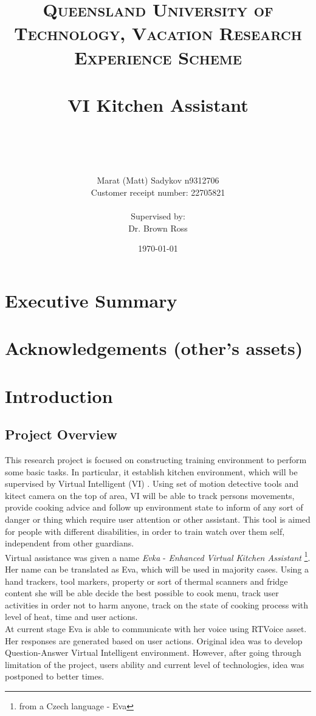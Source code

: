 \documentclass[18pt]{article}
\title{	
	\normalfont \normalsize 
	\textsc{Queensland University of Technology, Vacation Research Experience Scheme} \\ [25pt] 
	\horrule{0.5pt} \\[0.4cm] %
	\huge VI Kitchen Assistant \\ %
	\author{Marat (Matt) Sadykov \small n9312706 \\  Customer receipt number: \small 22705821 \\ \\ Supervised by: \\ Dr. Brown Ross \\ }
	\date{\normalsize\today} %
	\horrule{2pt} \\[0.5cm] %
}
\numberwithin{equation}{section} %
\numberwithin{figure}{section} %
\numberwithin{table}{section} %
\begin{document}
\maketitle
\newpage
\section{Executive Summary}
\section{Acknowledgements (other's assets)}
\section{Introduction}
\subsection{Project Overview}
	\large This research project is focused on constructing training environment to perform some basic tasks. In particular, it establish kitchen environment, which will be supervised by Virtual Intelligent (VI)  . Using set of motion detective tools and kitect camera on the top of area, VI will be able to track persons movements, provide cooking advice and follow up environment state to inform of any sort of danger or thing which require user attention or other assistant. This tool is aimed for people with different disabilities, in order to train watch over them self, independent from other guardians. \\
	
	\large Virtual assistance was given a name \textit{Evka} - \textit{Enhanced Virtual Kitchen Assistant} \footnote{from a Czech language - Eva}. Her name can be translated as Eva, which will be used in majority cases. Using a hand trackers, tool markers, property or sort of thermal scanners and fridge content she will be able decide the best possible to cook menu, track user activities in order not to harm anyone, track on the state of cooking process with level of heat, time and user actions. \\
	
	At current stage Eva is able to communicate with her voice using RTVoice asset. Her responses are generated based on user actions. Original idea was to develop Question-Answer Virtual Intelligent environment. However, after going through limitation of the project, users ability and current level of technologies, idea was postponed to better times. \\
	
\end{document}
